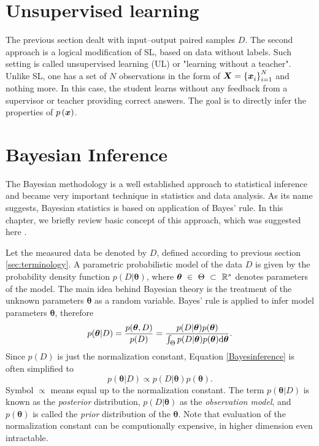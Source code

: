 \section{Unsupervised learning}
The previous section dealt with input--output paired samples $D$. The second approach is a logical modification of SL, based on data without labels. Such setting is called unsupervised learning (UL) or "learning without a teacher". Unlike SL, one has a set of $N$ observations in the form of $\boldsymbol{X} = \left\lbrace \boldsymbol{x}_i^{}\right\rbrace_{i=1}^N$ and nothing more. In this case, the student learns without any feedback from a supervisor or teacher providing correct answers. The goal is to directly infer the properties of $p\left( \boldsymbol{x} \right)$.




\section{Bayesian Inference}
The Bayesian methodology is a well established approach to statistical inference and became very important technique in statistics and data analysis. As its name suggests, Bayesian statistics is based on application of Bayes' rule. In this chapter, we briefly review basic concept of this approach, which was suggested here \cite{smidl}. 

 Let the measured data be denoted by $D$, defined according to previous section \ref{sec:terminology}. A parametric probabilistic model of the data $D$ is given by the probability density function  $p\left(D|\boldsymbol{\theta}\right)$, where $\boldsymbol{\theta}~\in~\Theta~\subset~\mathbb{R}^s$ denotes parameters of the model. The main idea behind Bayesian theory is the treatment of the unknown parameters $\boldsymbol{\theta}$ as a random variable.  Bayes' rule is applied to infer model parameters $\boldsymbol{\theta}$, therefore
 \begin{equation}\label{Bayesinference}
 	p(\boldsymbol{\theta} | D) = \frac{p(\boldsymbol{\theta}, D)}{p(D)} = \frac{p(D| \boldsymbol{\theta})p(\boldsymbol{\theta})}{\int_{\Theta}p(D|\boldsymbol{\theta})p(\boldsymbol{\theta})\mathrm{d}\boldsymbol{\theta}}.
 \end{equation} 
Since $p(D)$ is just the normalization constant, Equation \eqref{Bayesinference} is often simplified to
\begin{equation}
	p(\boldsymbol{\theta} | D) \propto p(D| \boldsymbol{\theta})p(\boldsymbol{\theta}).
\end{equation} 
Symbol $\propto$ means equal up to the normalization constant. The term $p(\boldsymbol{\theta} | D)$ is known as the \emph{posterior} distribution, $p(D| \boldsymbol{\theta})$  as the \emph{observation model}, and $p(\boldsymbol{\theta})$ is called the \emph{prior} distribution of the $\boldsymbol{\theta}$. Note that evaluation of the normalization constant can be computionally expensive, in higher dimension even intractable. 

